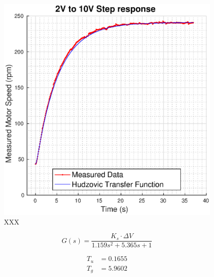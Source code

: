 \begin{figure}
    \centering
    \includegraphics[width=\linewidth]{images/hudzovic}
    \caption{XXX}
\end{figure}

\begin{equation}
    G(s) = \frac{K_s \cdot \Delta V}{1.159 s^2 + 5.365 s + 1}
\end{equation}

\begin{align}
    T_u  &= 0.1655 \\
    T_g  &= 5.9602
\end{align}
